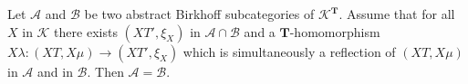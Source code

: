 Let $\mathcal{A}$ and $\mathcal{B}$ be two abstract Birkhoff subcategories of $\mathcal{K}^{\mathbf{T}}$. Assume that for all $X$ in $\mathcal{K}$ there exists $(XT', \xi_X)$ in $\mathcal{A} \cap \mathcal{B}$ and a $\mathbf{T}$-homomorphism $X\lambda : (XT, X\mu) \longrightarrow (XT', \xi_X)$ which is simultaneously a reflection of $(XT, X\mu)$ in $\mathcal{A}$ and in $\mathcal{B}$. Then $\mathcal{A} = \mathcal{B}$.
